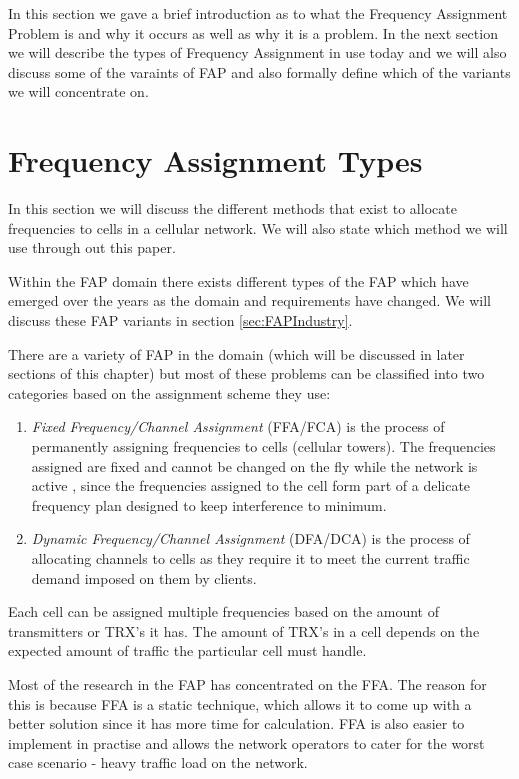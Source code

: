 In this section we gave a brief introduction as to what the Frequency Assignment Problem is and why it occurs as well as why it is a problem. In the next section we will describe the types of Frequency Assignment in use today and we will also discuss some of the varaints of FAP and also formally define which of the variants we will concentrate on.
\section{Frequency Assignment Types}
\label{sec:FreqAssignmentTypes}
In this section we will discuss the different methods that exist to allocate frequencies to cells in a cellular network. We will also state which method we will use through out this paper.

Within the FAP domain there exists different types of the FAP which have emerged over the years as the domain and requirements have changed. We will discuss these FAP variants in section \ref{sec:FAPIndustry}.

There are a variety of FAP in the domain (which will be discussed in later sections of this chapter) but most of these problems can be classified into two categories based on the assignment scheme they use:
\begin{enumerate}[\bf{(}a\bf{)}]
\item \emph{Fixed Frequency/Channel Assignment} (FFA/FCA) is the process of permanently assigning frequencies to cells (cellular towers). The frequencies assigned are fixed and cannot be changed on the fly while the network is active , since the frequencies assigned to the cell form part of a delicate frequency plan designed to keep interference to minimum.
\item \emph{Dynamic Frequency/Channel Assignment} (DFA/DCA) is the process of allocating channels to cells as they require it to meet the current traffic demand imposed on them by clients. 
\end{enumerate}
Each cell can be assigned multiple frequencies based on the amount of transmitters or TRX's it has. The amount of TRX's in a cell depends on the expected amount of traffic the particular cell must 
handle.

Most of the research in the FAP has concentrated on the FFA. The reason for this is because FFA is a static technique, which allows it to come up with a better solution since it has more time for calculation. FFA is also easier to implement in practise and allows the network operators to cater for the worst case scenario - heavy traffic load on the network. 

